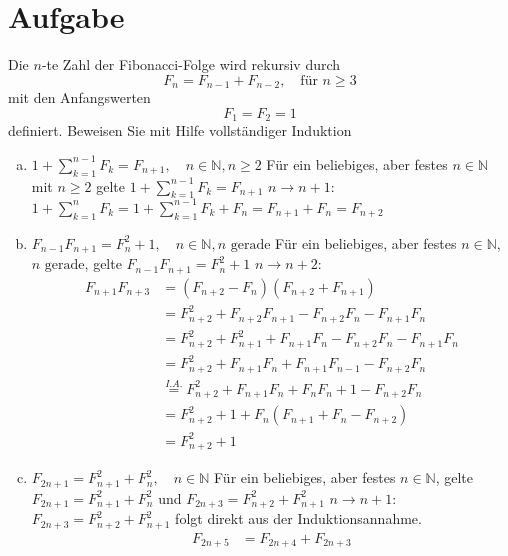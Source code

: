\documentclass{article}
\begin{document}
	\section{Aufgabe}
	Die $n$-te Zahl der Fibonacci-Folge wird rekursiv durch
	\[F_n = F_{n-1} + F_{n-2},\quad \text{für $n\geq 3$}\]
	mit den Anfangswerten 
	\[F_1 = F_2 = 1\]
	definiert. Beweisen Sie mit Hilfe vollständiger Induktion
	\begin{enumerate}[(a)]
		\item $1 + \displaystyle \sum_{k=1}^{n-1} F_k = F_{n+1},\quad n\in \mathbb{N}, n\geq 2$
		{Für ein beliebiges, aber festes $n\in \mathbb{N}$ mit $n\geq 2$ gelte $1 + \displaystyle \sum_{k=1}^{n-1} F_k = F_{n+1}$}
		{$n\to n+1$:\quad $1 + \sum_{k=1}^{n}F_k = 1 + \sum_{k=1}^{n-1}F_k + F_n = F_{n+1} + F_n = F_{n+2}$}
		\item $\displaystyle F_{n-1}F_{n+1} = F_n^2+1,\quad n\in \mathbb{N}, n \text{ gerade}$
		{Für ein beliebiges, aber festes $n\in \mathbb{N}$, $n\text{ gerade}$, gelte $\displaystyle F_{n-1}F_{n+1} = F_n^2+1$}
		{$n \to n+2$:\begin{align*}
				F_{n+1}F_{n+3} &= (F_{n+2} - F_n)(F_{n+2}+F_{n+1})\\
				&= F_{n+2}^2+F_{n+2}F_{n+1} - F_{n+2}F_n - F_{n+1}F_n\\
				&= F_{n+2}^2+F_{n+1}^2 + F_{n+1}F_n - F_{n+2}F_n - F_{n+1}F_n\\
				&= F_{n+2}^2+F_{n+1}F_n + F_{n+1}F_{n-1} - F_{n+2}F_n\\
				&\overset{I.A.}{=} F_{n+2}^2+F_{n+1}F_n + F_nF_n + 1 - F_{n+2}F_n\\
				&= F_{n+2}^2 + 1 + F_n(F_{n+1} + F_n - F_{n+2})\\
				&= F_{n+2}^2 + 1
			\end{align*}}
		\item $\displaystyle F_{2n+1} = F_{n+1}^2 + F_n^2, \quad n\in \mathbb{N}$
		{Für ein beliebiges, aber festes $n\in \mathbb{N}$, gelte $\displaystyle F_{2n+1} = F_{n+1}^2+F_{n}^2$ und $\displaystyle F_{2n+3} = F_{n+2}^2+F_{n+1}^2$}
		{$n\to n+1$: $F_{2n+3} = F_{n+2}^2 + F_{n+1}^2$ folgt direkt aus der Induktionsannahme.
			\begin{align*}
			F_{2n+5} &= F_{2n+4} + F_{2n+3}\\

\end{align*}}
\end{enumerate}
\end{document}
